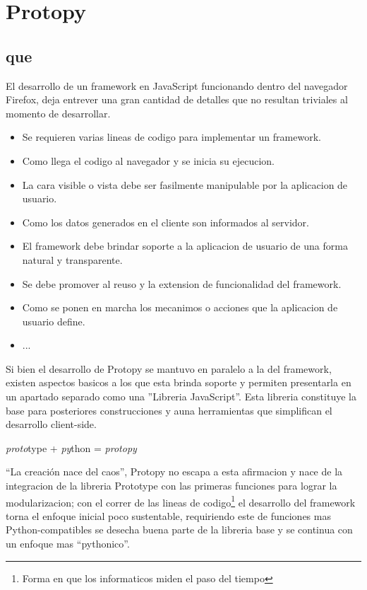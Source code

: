 \chapter{Protopy}

\section{que}
El desarrollo de un framework en JavaScript funcionando dentro del navegador
Firefox, deja entrever una gran cantidad de detalles que no resultan triviales
al momento de desarrollar.
\begin{itemize}
 \item Se requieren varias lineas de codigo para implementar un framework.
 \item Como llega el codigo al navegador y se inicia su ejecucion.
 \item La cara visible o vista debe ser fasilmente manipulable por la aplicacion
de usuario.
 \item Como los datos generados en el cliente son informados al servidor.
 \item El framework debe brindar soporte a la aplicacion de usuario de una forma
natural y transparente.
 \item Se debe promover al reuso y la extension de funcionalidad del framework.
 \item Como se ponen en marcha los mecanimos o acciones que la aplicacion de
usuario define.
 \item ...
\end{itemize} 
Si bien el desarrollo de Protopy se mantuvo en paralelo a la del
framework, existen aspectos basicos a los que esta brinda soporte y permiten
presentarla en un apartado separado como una ''Libreria JavaScript''. Esta
libreria constituye la base para posteriores construcciones y auna
herramientas que simplifican el desarrollo client-side.

\textit{proto}type + \textit{py}thon = \textit{protopy}

``La creación nace del caos'', Protopy no escapa a esta afirmacion y nace de la
integracion de la libreria Prototype con las primeras funciones para lograr
la modularizacion; con el correr de las lineas de codigo\footnote{Forma en que
los informaticos miden el paso del tiempo} el desarrollo del framework torna
el enfoque inicial poco sustentable, requiriendo este de funciones mas
Python-compatibles se desecha buena parte de la libreria base y se continua con
un enfoque mas ``pythonico''.

